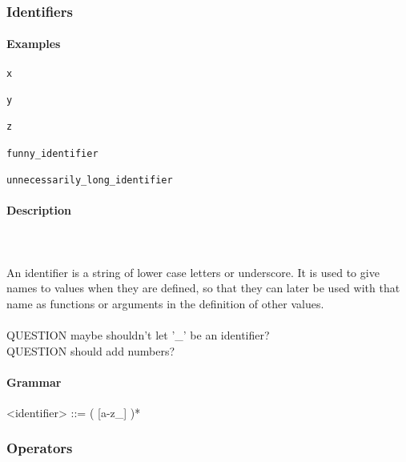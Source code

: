 \documentclass{article}
\def\pend{\mbox{} \\\\}
\begin{document}
\subsubsection{Identifiers}

\paragraph{Examples}

\begin{verbatim}
x

y

z 

funny_identifier 

unnecessarily_long_identifier
\end{verbatim}

\paragraph{Description}\pend
An identifier is a string of lower case letters or underscore. It is used to give
names to values when they are defined, so that they can later be used with that 
name as functions or arguments in the definition of other values.
\\\\
QUESTION maybe shouldn't let '\_' be an identifier?  \\
QUESTION should add numbers?

\paragraph{Grammar}
\begin{grammar}
<identifier> ::= ( [a-z_] )*
\end{grammar}

\newpage
\subsubsection{Operators}
\end{document}
